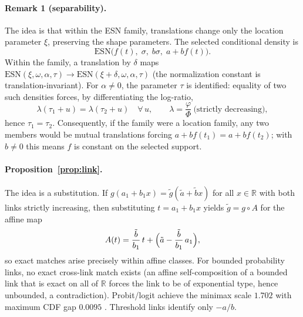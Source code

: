 \documentclass[conference]{IEEEtran}
\begin{document}
\paragraph{Remark 1 (separability).}
The idea is that within the ESN family, translations change only the location parameter
$\xi$, preserving the shape parameters. The selected conditional density is
\begin{equation}
\mathrm{ESN}\bigl(f(t),\;\sigma,\;b\sigma,\;a+bf(t)\bigr).
\label{eq:proof_selected_esn}
\end{equation}
Within the family, a translation by $\delta$ maps
$\mathrm{ESN}(\xi,\omega,\alpha,\tau)\to\mathrm{ESN}(\xi+\delta,\omega,\alpha,\tau)$
(the normalization constant is translation-invariant). For $\alpha\ne0$, the parameter
$\tau$ is identified: equality of two such densities forces, by differentiating the
log-ratio,
\begin{equation}
\lambda(\tau_1+u)=\lambda(\tau_2+u)\quad\forall\,u,\qquad
\lambda=\frac{\varphi}{\Phi}\ \text{(strictly decreasing)},
\label{eq:proof_mills}
\end{equation}
hence $\tau_1=\tau_2$. Consequently, if the family were a location family, any two members
would be mutual translations forcing $a+bf(t_1)=a+bf(t_2)$; with $b\ne0$ this means $f$
is constant on the selected support.

\paragraph{Proposition~\ref{prop:link}.}
The idea is a substitution. If $g(a_1+b_1x)=\tilde g(\tilde a+\tilde b x)$ for all
$x\in\mathbb{R}$ with both links strictly increasing, then substituting $t=a_1+b_1x$
yields $\tilde g = g\circ A$ for the affine map
\begin{equation}
A(t)=\frac{\tilde b}{b_1}\,t+\Bigl(\tilde a-\frac{\tilde b}{b_1}\,a_1\Bigr),
\label{eq:proof_affine}
\end{equation}
so exact matches arise precisely within affine classes. For bounded probability links,
no exact cross-link match exists (an affine self-composition of a bounded link that is
exact on all of $\mathbb{R}$ forces the link to be of exponential type, hence unbounded,
a contradiction). Probit/logit achieve the minimax scale $1.702$ with maximum CDF gap
$0.0095$ \cite{haley1952,amemiya1981}. Threshold links identify only $-a/b$.
\end{document}
